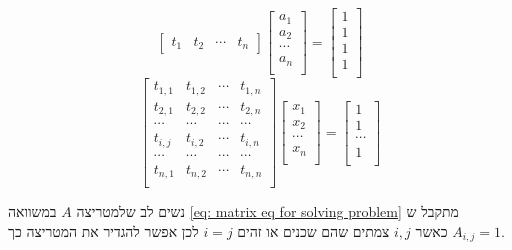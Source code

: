 \documentclass[12pt,twoside]{article}
\begin{document}
\begin{equation*}
    \begin{bmatrix}
        t_1 & t_2 & \cdots & t_n
    \end{bmatrix}
    \begin{bmatrix}
        a_1 \\
        a_2 \\
        \cdots \\
        a_n \\
    \end{bmatrix}
    =
    \begin{bmatrix}
        1 \\
        1 \\
        1 \\
        1 \\
    \end{bmatrix}
\end{equation*}
\begin{equation}
    \label{eq: matrix eq for solving problem}
    \begin{bmatrix}
        t_{1,1} & t_{1,2} & \cdots & t_{1,n} \\
        t_{2,1} & t_{2,2} & \cdots & t_{2,n} \\
        \cdots & \cdots & \cdots & \cdots\\
        t_{i,j} & t_{i,2} & \cdots & t_{i,n} \\
        \cdots & \cdots & \cdots & \cdots\\
        t_{n,1} & t_{n,2} & \cdots & t_{n,n} \\
    \end{bmatrix}
    \begin{bmatrix}
        x_1 \\
        x_2 \\
        \cdots \\
        x_n \\
    \end{bmatrix}
    = 
    \begin{bmatrix}
        1 \\
        1 \\
        \cdots \\
        1 \\
    \end{bmatrix}
\end{equation}

נשים לב שלמטריצה
$A$
במשוואה
\ref{eq: matrix eq for solving problem}
מתקבל ש
$A_{i,j} = 1$
כאשר 
$i, j$
צמתים שהם שכנים או זהים
$i = j$
לכן אפשר להגדיר את המטריצה כך.
\end{document}
